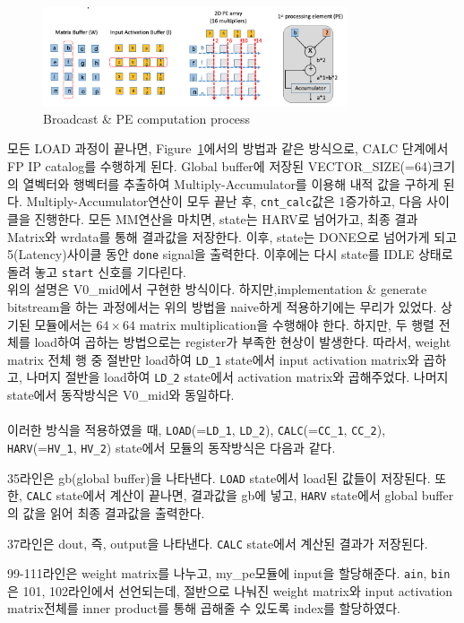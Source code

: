 \documentclass{article}
\begin{document}
\begin{figure}[ht]
	\centering
	\includegraphics[width=0.8\textwidth]{fig/broadcast_mm.png}
\caption{Broadcast \& PE computation process}
\label{fig3}
\end{figure}
모든 LOAD 과정이 끝나면, Figure~\ref{fig3}에서의 방법과 같은 방식으로, CALC 단계에서 FP IP\cite{FP_MAC} catalog를 수행하게 된다. Global buffer에 저장된 VECTOR\_SIZE(=64)크기의 열벡터와 행벡터를 추출하여 Multiply-Accumulator를 이용해 내적 값을 구하게 된다. Multiply-Accumulator연산이 모두 끝난 후, \texttt{cnt\_calc}값은 1증가하고, 다음 사이클을 진행한다. 모든 MM연산을 마치면, state는 HARV로 넘어가고, 최종 결과 Matrix와 wrdata를 통해 결과값을 저장한다. 이후, state는 DONE으로 넘어가게 되고 5(Latency)사이클 동안 \texttt{done} signal을 출력한다. 이후에는 다시 state를 IDLE 상태로 돌려 놓고 \texttt{start} 신호를 기다린다.\\

위의 설명은 V0\_mid에서 구현한 방식이다. 하지만,implementation \& generate bitstream을 하는 과정에서는 위의 방법을 naive하게 적용하기에는 무리가 있었다. 상기된 모듈에서는 $64\times64$ matrix multiplication을 수행해야 한다. 하지만, 두 행렬 전체를  load하여 곱하는 방법으로는 register가 부족한 현상이 발생한다. 따라서,  weight matrix 전체 행 중 절반만 load하여 \texttt{LD\_1} state에서 input activation matrix와 곱하고, 나머지 절반을 load하여 \texttt{LD\_2} state에서 activation matrix와 곱해주었다. 나머지 state에서 동작방식은 V0\_mid와 동일하다.\\\\
이러한 방식을 적용하였을 때, \texttt{LOAD}(=\texttt{LD\_1}, \texttt{LD\_2}), \texttt{CALC}(=\texttt{CC\_1}, \texttt{CC\_2}), \texttt{HARV}(=\texttt{HV\_1}, \texttt{HV\_2}) state에서 모듈의 동작방식은  다음과 같다.
\begin{itemize*}
    \item 35라인은 gb(global buffer)을 나타낸다. \texttt{LOAD} state에서 load된 값들이 저장된다. 또한, \texttt{CALC} state에서 계산이 끝나면, 결과값을 gb에 넣고, \texttt{HARV} state에서 global buffer의 값을 읽어 최종 결과값을 출력한다.
    \item 37라인은 dout, 즉, output을 나타낸다. \texttt{CALC} state에서 계산된 결과가 저장된다.
    \item 99-111라인은 weight matrix를 나누고, my\_pe모듈에 input을 할당해준다. \texttt{ain}, \texttt{bin}은 101, 102라인에서 선언되는데, 절반으로 나눠진 weight matrix와 input activation matrix전체를 inner product를 통해 곱해줄 수 있도록 index를 할당하였다.
\end{itemize*}
\end{document}
